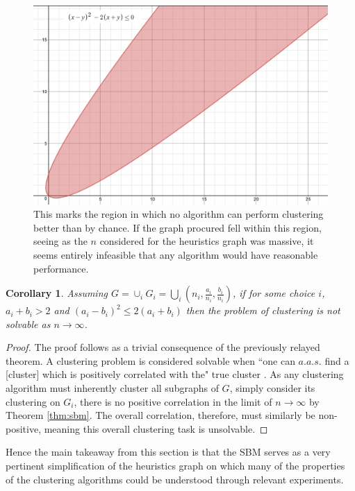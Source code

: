 \documentclass{article}
\newtheorem{corollary}{Corollary}[theorem]
\begin{document}
\begin{figure}
    \centering
    \includegraphics[width=.60\textwidth]{region.png}
    \caption[Region of No Deanonymization]{This marks the region in which no algorithm can perform clustering better than by chance. If the graph procured fell within this region, seeing as the $n$ considered for the heuristics graph was massive, it seems entirely infeasible that any algorithm would have reasonable performance.}
    \label{fig:region}
\end{figure}

\begin{corollary}
Assuming $G=\cup_{i}G_i=\bigcup_{i}(n_i,\frac{a_i}{n_i},\frac{b_i}{n_i})$, if for some choice $i$, $a_i + b_i > 2$ and $(a_i-b_i)^2\le2(a_i+b_i)$ then the problem of clustering is not solvable as $n\rightarrow\infty$.
\end{corollary}

\begin{proof}
The proof follows as a trivial consequence of the previously relayed theorem. A clustering problem is considered solvable when ``one can $a.a.s.$ find a [cluster] which is positively correlated with the" true cluster \cite{sbm}. As any clustering algorithm must inherently cluster all subgraphs of $G$, simply consider its clustering on $G_i$, there is no positive correlation in the limit of $n\rightarrow\infty$ by Theorem \ref{thm:sbm}. The overall correlation, therefore, must similarly be non-positive, meaning this overall clustering task is unsolvable.
\end{proof}

Hence the main takeaway from this section is that the SBM serves as a very pertinent simplification of the heuristics graph on which many of the properties of the clustering algorithms could be understood through relevant experiments.
\end{document}
